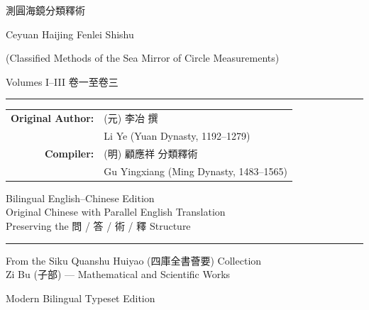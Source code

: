 \documentclass[11pt,a4paper]{article}
\newcommand{\shortline}{\noindent\rule{0.5\textwidth}{0.4pt}\par}
\begin{document}
\thispagestyle{empty}
\begin{center}
\vspace*{1.5cm}
{\fontsize{32}{40}\selectfont
\textcolor{titlecolor}{測圓海鏡分類釋術}}

\vspace{0.8cm}
{\Large\textcolor{sectioncolor}{Ceyuan Haijing Fenlei Shishu}}

\vspace{0.3cm}
{\normalsize\textcolor{sectioncolor}{(Classified Methods of the Sea Mirror of Circle Measurements)}}

\vspace{1cm}
{\Large\textcolor{sectioncolor}{Volumes I--III \quad 卷一至卷三}}

\vspace{1.5cm}
\shortline

\vspace{0.8cm}
{\large
\begin{tabular}{rl}
\textbf{Original Author:} & (元) 李冶 撰 \\[-0.2em]
                          & Li Ye (Yuan Dynasty, 1192--1279) \\[0.5em]
\textbf{Compiler:}        & (明) 顧應祥 分類釋術 \\[-0.2em]
                          & Gu Yingxiang (Ming Dynasty, 1483--1565) \\
\end{tabular}
}

\vspace{1cm}
{\normalsize\textcolor{notecolor}{%
Bilingual English--Chinese Edition\\[0.3em]
Original Chinese with Parallel English Translation\\[0.3em]
Preserving the 問 / 答 / 術 / 釋 Structure
}}

\vspace{1.5cm}
\shortline

\vspace{0.8cm}
{\normalsize\textcolor{sectioncolor}{%
From the Siku Quanshu Huiyao (四庫全書薈要) Collection\\[0.3em]
Zi Bu (子部) --- Mathematical and Scientific Works}}

\vspace{0.8cm}
{\small\textcolor{sectioncolor}{Modern Bilingual Typeset Edition}}

\end{center}
\clearpage
\end{document}
